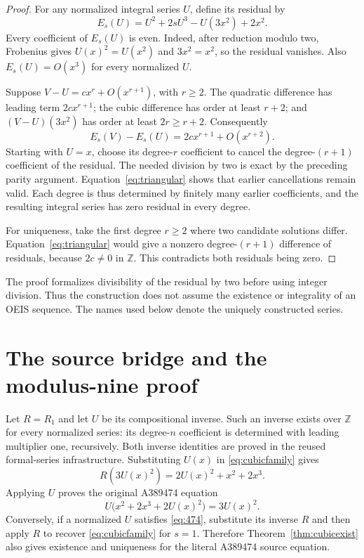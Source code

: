 \documentclass[11pt,a4paper]{article}
\theoremstyle{remark}
\newcommand{\Z}{\mathbb Z}
\begin{document}
\begin{proof}
For any normalized integral series $U$, define its residual by
\[
E_s(U)=U^2+2sU^3-U(3x^2)+2x^2.
\]
Every coefficient of $E_s(U)$ is even. Indeed, after reduction modulo
two, Frobenius gives $U(x)^2=U(x^2)$ and $3x^2=x^2$, so the residual
vanishes. Also $E_s(U)=O(x^3)$ for every normalized $U$.

Suppose $V-U=cx^r+O(x^{r+1})$, with $r\ge2$. The quadratic difference
has leading term $2cx^{r+1}$; the cubic difference has order at least
$r+2$; and $(V-U)(3x^2)$ has order at least $2r\ge r+2$.
Consequently
\begin{equation}\label{eq:triangular}
E_s(V)-E_s(U)=2cx^{r+1}+O(x^{r+2}).
\end{equation}
Starting with $U=x$, choose its degree-$r$ coefficient to cancel the
degree-$(r+1)$ coefficient of the residual. The needed division by two
is exact by the preceding parity argument. Equation~\eqref{eq:triangular}
shows that earlier cancellations remain valid. Each degree is thus
determined by finitely many earlier coefficients, and the resulting
integral series has zero residual in every degree.

For uniqueness, take the first degree $r\ge2$ where two candidate
solutions differ. Equation~\eqref{eq:triangular} would give a nonzero
degree-$(r+1)$ difference of residuals, because $2c\ne0$ in $\Z$.
This contradicts both residuals being zero.
\end{proof}

The proof formalizes divisibility of the residual by two before using
integer division. Thus the construction does not assume the existence
or integrality of an OEIS sequence. The names used below denote the
uniquely constructed series.

\section{The source bridge and the modulus-nine proof}

Let $R=R_1$ and let $U$ be its compositional inverse. Such an inverse
exists over $\Z$ for every normalized series: its degree-$n$ coefficient
is determined with leading multiplier one, recursively. Both inverse
identities are proved in the reused formal-series infrastructure.
Substituting $U(x)$ in \eqref{eq:cubicfamily} gives
\[
R(3U(x)^2)=2U(x)^2+x^2+2x^3.
\]
Applying $U$ proves the original A389474 equation
\begin{equation}\label{eq:474}
U\bigl(x^2+2x^3+2U(x)^2\bigr)=3U(x)^2.
\end{equation}
Conversely, if a normalized $U$ satisfies \eqref{eq:474}, substitute its
inverse $R$ and then apply $R$ to recover \eqref{eq:cubicfamily} for
$s=1$. Therefore Theorem~\ref{thm:cubicexist} also gives existence and
uniqueness for the literal A389474 source equation.
\end{document}
